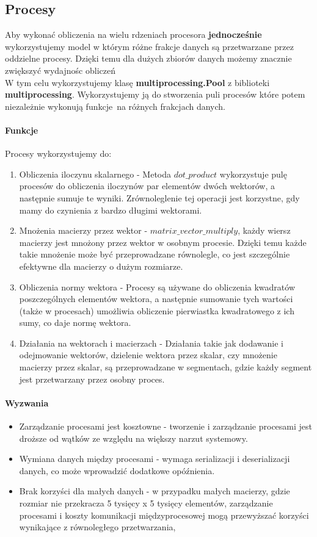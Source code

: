 \subsection{Procesy}
Aby wykonać obliczenia na wielu rdzeniach procesora \textbf{jednocześnie} wykorzystujemy model w którym różne 
frakcje danych są przetwarzane przez oddzielne procesy. Dzięki temu dla dużych zbiorów danych możemy 
znacznie zwiększyć wydajnośc obliczeń \\ 
W tym celu wykorzystujemy klasę \textbf{multiprocessing.Pool} z biblioteki \textbf{multiprocessing}. 
Wykorzystujemy ją do stworzenia puli procesów które potem niezależnie wykonują funkcje na różnych frakcjach 
danych.
\paragraph{Funkcje}
Procesy wykorzystujemy do:
\begin{enumerate}
    \item Obliczenia iloczynu skalarnego - Metoda $dot\_product$ wykorzystuje pulę procesów do obliczenia iloczynów par elementów dwóch wektorów, a następnie sumuje te wyniki. Zrównoleglenie tej operacji jest korzystne, gdy mamy do czynienia z bardzo długimi wektorami.
    \item Mnożenia macierzy przez wektor - $matrix\_vector\_multiply$, każdy wiersz macierzy jest mnożony przez wektor w osobnym procesie. Dzięki temu każde takie mnożenie może być przeprowadzane równolegle, co jest szczególnie efektywne dla macierzy o dużym rozmiarze.
    \item Obliczenia normy wektora - Procesy są używane do obliczenia kwadratów poszczególnych elementów wektora, a następnie sumowanie tych wartości (także w procesach) umożliwia obliczenie pierwiastka kwadratowego z ich sumy, co daje normę wektora.
    \item Działania na wektorach i macierzach - Działania takie jak dodawanie i odejmowanie wektorów, dzielenie wektora przez skalar, czy mnożenie macierzy przez skalar, są przeprowadzane w segmentach, gdzie każdy segment jest przetwarzany przez osobny proces. 
\end{enumerate}
\paragraph{Wyzwania}
\begin{itemize}
    \item Zarządzanie procesami jest kosztowne - tworzenie i zarządzanie procesami jest droższe od wątków ze względu na większy narzut systemowy.
    \item Wymiana danych między procesami - wymaga serializacji i deserializacji danych, co może wprowadzić dodatkowe opóźnienia. 
    \item Brak korzyści dla małych danych - w przypadku małych macierzy, gdzie rozmiar nie przekracza 5 tysięcy x 5 tysięcy elementów, zarządzanie procesami i koszty komunikacji międzyprocesowej mogą przewyższać korzyści wynikające z równoległego przetwarzania,
\end{itemize}

